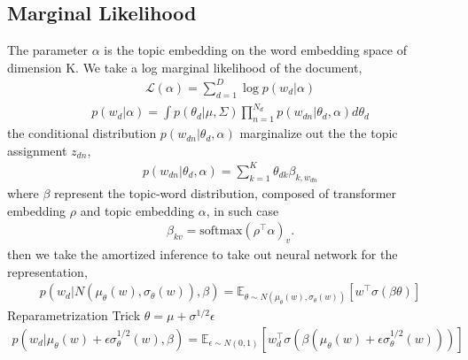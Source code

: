 \subsection{Marginal Likelihood}
The parameter $ \alpha $ is the topic embedding on the word embedding space of dimension K. We take a log marginal likelihood of the document,
\begin{align*}
\mathcal{L}(\alpha)=\sum_{d=1}^{D}\log p(w_d|\alpha)
\end{align*}
\begin{align*}
p(w_d|\alpha)=\int p(\theta_d|\mu,\Sigma)\prod_{n=1}^{N_d}p(w_{dn}|\theta_d,\alpha)d\theta_d
\end{align*}
the conditional distribution $ p(w_{dn}|\theta_d,\alpha) $ marginalize out the the topic assignment $ z_{dn} $,
\begin{align*}
p(w_{dn}|\theta_d,\alpha)=\sum_{k=1}^{K}\theta_{dk}\beta_{k,w_{dn}}
\end{align*}
where $ \beta $ represent the topic-word distribution, composed of transformer embedding $ \rho $ and topic embedding $ \alpha $, in such case
\begin{align*}
\beta_{kv}=\text{softmax}(\rho^\top\alpha)_{v}.
\end{align*}
then we take the amortized inference to take out neural network for the representation,
\begin{align*}
p(w_{d}|N(\mu_\theta(w),\sigma_\theta(w)),\beta)=\mathbb{E}_{\theta\sim N(\mu_\theta(w),\sigma_\theta(w))}\left[w^\top\sigma(\beta\theta)\right]
\end{align*}
Reparametrization Trick $ \theta=\mu+\sigma^{1/2}\epsilon $\\
\begin{align*}
p(w_{d}|\mu_\theta(w)+\epsilon\sigma^{1/2}_\theta(w),\beta)=\mathbb{E}_{\epsilon\sim N(0,1)}\left[w_d^\top\sigma(\beta(\mu_\theta(w)+\epsilon\sigma^{1/2}_\theta(w)))\right]
\end{align*}
